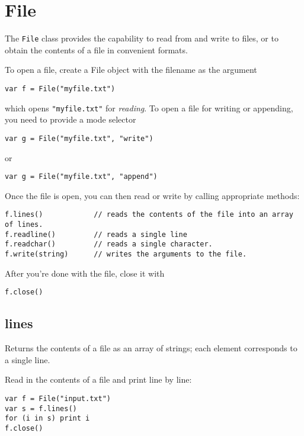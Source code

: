 \hypertarget{file}{%
\section{File}\label{file}}

The \texttt{File} class provides the capability to read from and write
to files, or to obtain the contents of a file in convenient formats.

To open a file, create a File object with the filename as the argument

\begin{lstlisting}
var f = File("myfile.txt")
\end{lstlisting}

which opens \texttt{"myfile.txt"} for \emph{reading}. To open a file for
writing or appending, you need to provide a mode selector

\begin{lstlisting}
var g = File("myfile.txt", "write")
\end{lstlisting}

or

\begin{lstlisting}
var g = File("myfile.txt", "append")
\end{lstlisting}

Once the file is open, you can then read or write by calling appropriate
methods:

\begin{lstlisting}
f.lines()            // reads the contents of the file into an array of lines.
f.readline()         // reads a single line
f.readchar()         // reads a single character.
f.write(string)      // writes the arguments to the file.
\end{lstlisting}

After you're done with the file, close it with

\begin{lstlisting}
f.close()
\end{lstlisting}

\hypertarget{lines}{%
\subsection{lines}\label{lines}}

Returns the contents of a file as an array of strings; each element
corresponds to a single line.

Read in the contents of a file and print line by line:

\begin{lstlisting}
var f = File("input.txt")
var s = f.lines()
for (i in s) print i
f.close()
\end{lstlisting}


